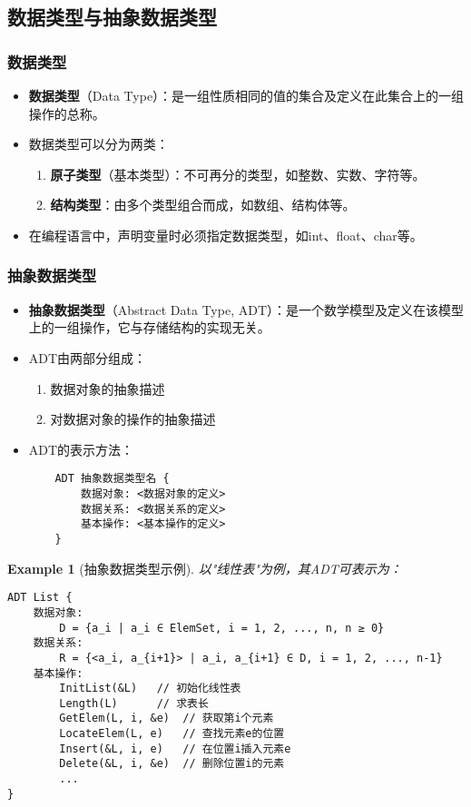 \documentclass{../../note}
\newtheorem{example}{Example}
\begin{document}
\subsection{数据类型与抽象数据类型}

\subsubsection{数据类型}
\begin{itemize}
  \item \textbf{数据类型}（Data Type）：是一组性质相同的值的集合及定义在此集合上的一组操作的总称。
  \item 数据类型可以分为两类：
    \begin{enumerate}
      \item \textbf{原子类型}（基本类型）：不可再分的类型，如整数、实数、字符等。
      \item \textbf{结构类型}：由多个类型组合而成，如数组、结构体等。
    \end{enumerate}
  \item 在编程语言中，声明变量时必须指定数据类型，如int、float、char等。
\end{itemize}

\subsubsection{抽象数据类型}
\begin{itemize}
  \item \textbf{抽象数据类型}（Abstract Data Type, ADT）：是一个数学模型及定义在该模型上的一组操作，它与存储结构的实现无关。
  \item ADT由两部分组成：
    \begin{enumerate}
      \item 数据对象的抽象描述
      \item 对数据对象的操作的抽象描述
    \end{enumerate}
  \item ADT的表示方法：
    \begin{verbatim}
    ADT 抽象数据类型名 {
        数据对象: <数据对象的定义>
        数据关系: <数据关系的定义>
        基本操作: <基本操作的定义>
    }
    \end{verbatim}
\end{itemize}

\begin{example}[抽象数据类型示例]
  以"线性表"为例，其ADT可表示为：
\begin{verbatim}
ADT List {
    数据对象:
        D = {a_i | a_i ∈ ElemSet, i = 1, 2, ..., n, n ≥ 0}
    数据关系:
        R = {<a_i, a_{i+1}> | a_i, a_{i+1} ∈ D, i = 1, 2, ..., n-1}
    基本操作:
        InitList(&L)   // 初始化线性表
        Length(L)      // 求表长
        GetElem(L, i, &e)  // 获取第i个元素
        LocateElem(L, e)   // 查找元素e的位置
        Insert(&L, i, e)   // 在位置i插入元素e
        Delete(&L, i, &e)  // 删除位置i的元素
        ...
}
\end{verbatim}
\end{example}
\end{document}
